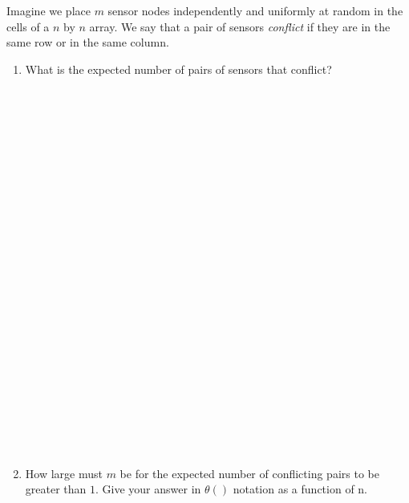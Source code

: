 \documentclass[11pt]{article}
\newcommand{\ans}[1]{}
\begin{document}
\begin{enumerate}
\extrapage



Imagine we place $m$ sensor nodes independently and uniformly at random in the cells of a $n$ by $n$ array.  We say that a pair of sensors \emph{conflict} if they are in the same row or in the same column.

\begin{enumerate}

\item What is the expected number of pairs of sensors that conflict? \ans{Let $X$ be the number of pairs of sensors that conflict.  For some pair of castles $i,j$, let $X_{i,j}$ be an indicator variable that is $1$ if the pair can attack and $0$ otherwise.  Then $E(X) = \sum_{i,j} E(X_{i,j})$ by linearity of expectation.  Note that $E(X_{i,j}) = (2n-1)/n^{2}$.  Thus, $E(X) = (m(m-1)/2) (2n-1)/n^{2}$.} \\ \ \\ \ \\ \ \\ \ \\ \ \\ \ \\ \ \\ \ \\ \ \\ \ \\ \ \\ \ \\ \ \\ \ \\ \ \\ \ \\ \ \\ \ \\ \ \\ \ \\ \ \\ \ \\ \ \\ \ \\





\item How large must $m$ be for the expected number of conflicting pairs to be greater than $1$. Give your answer in $\theta()$ notation as a function of n. \ans{$\theta(\sqrt{n})$}


\end{enumerate}






\end{enumerate}
\end{document}
